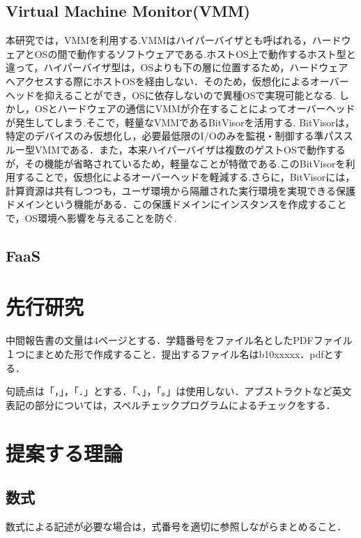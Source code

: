 \documentclass[11pt]{ujarticle} %
\begin{document}
\subsection{Virtual Machine Monitor(VMM)}
本研究では，VMMを利用する.VMMはハイパーバイザとも呼ばれる，ハードウェアとOSの間で動作するソフトウェアである.ホストOS上で動作するホスト型と違って，ハイパーバイザ型は，OSよりも下の層に位置するため，ハードウェアへアクセスする際にホストOSを経由しない．そのため，仮想化によるオーバーヘッドを抑えることができ，OSに依存しないので異種OSで実現可能となる. しかし，OSとハードウェアの通信にVMMが介在することによってオーバーヘッドが発生してしまう.そこで，軽量なVMMであるBitVisorを活用する.
BitVisorは，特定のデバイスのみ仮想化し，必要最低限のI/Oのみを監視・制御する準パススルー型VMMである．また，本来ハイパーバイザは複数のゲストOSで動作するが，その機能が省略されているため，軽量なことが特徴である.このBitVisorを利用することで，仮想化によるオーバーヘッドを軽減する.さらに，BitVisorには，計算資源は共有しつつも，ユーザ環境から隔離された実行環境を実現できる保護ドメインという機能がある．この保護ドメインにインスタンスを作成することで，OS環境へ影響を与えることを防ぐ.

\subsection{FaaS}



\section{先行研究}

中間報告書の文量は4ページとする．学籍番号をファイル名としたPDFファイル１つにまとめた形で作成すること．提出するファイル名はb10xxxxx．pdfとする．

句読点は「，」，「．」とする．「、」，「。」は使用しない．アブストラクトなど英文表記の部分については，スペルチェックプログラムによるチェックをする．

\section{提案する理論}

\subsection{数式}

数式による記述が必要な場合は，式番号を適切に参照しながらまとめること．
\end{document}
